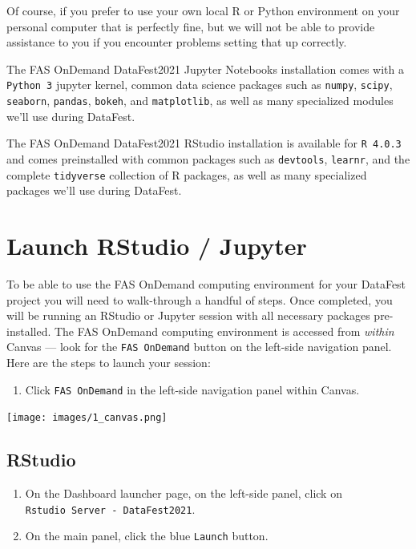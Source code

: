 \documentclass[]{book}
\providecommand{\tightlist}{%
  \setlength{\itemsep}{0pt}\setlength{\parskip}{0pt}}
\begin{document}
Of course, if you prefer to use your own local R or Python environment on your personal computer that is perfectly fine, but we will not be able to provide assistance to you if you encounter problems setting that up correctly.

The FAS OnDemand DataFest2021 Jupyter Notebooks installation comes with a \texttt{Python\ 3} jupyter kernel, common data science packages such as \texttt{numpy}, \texttt{scipy}, \texttt{seaborn}, \texttt{pandas}, \texttt{bokeh}, and \texttt{matplotlib}, as well as many specialized modules we'll use during DataFest.

The FAS OnDemand DataFest2021 RStudio installation is available for \texttt{R\ 4.0.3} and comes preinstalled with common packages such as \texttt{devtools}, \texttt{learnr}, and the complete \texttt{tidyverse} collection of R packages, as well as many specialized packages we'll use during DataFest.

\hypertarget{launch-rstudio-jupyter}{%
\chapter*{Launch RStudio / Jupyter}\label{launch-rstudio-jupyter}}

To be able to use the FAS OnDemand computing environment for your DataFest project you will need to walk-through a handful of steps. Once completed, you will be running an RStudio or Jupyter session with all necessary packages pre-installed. The FAS OnDemand computing environment is accessed from \emph{within} Canvas --- look for the \texttt{FAS\ OnDemand} button on the left-side navigation panel. Here are the steps to launch your session:

\begin{enumerate}
\def\labelenumi{\arabic{enumi}.}
\tightlist
\item
  Click \texttt{FAS\ OnDemand} in the left-side navigation panel within Canvas.
\end{enumerate}

\texttt{[image: images/1\_canvas.png]}

\hypertarget{rstudio}{%
\section{RStudio}\label{rstudio}}

\begin{enumerate}
\def\labelenumi{\arabic{enumi}.}
\setcounter{enumi}{1}
\tightlist
\item
  On the Dashboard launcher page, on the left-side panel, click on \texttt{Rstudio\ Server\ -\ DataFest2021}.
\item
  On the main panel, click the blue \texttt{Launch} button.
\end{enumerate}
\end{document}
